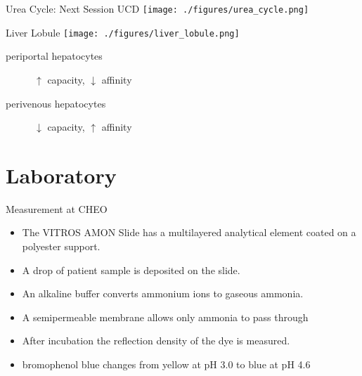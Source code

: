 \documentclass[presentation, smaller]{beamer}
\begin{document}
\begin{frame}[label={sec:orgheadline4}]{Urea Cycle: Next Session UCD}
\centering
   \texttt{[image: ./figures/urea\_cycle.png]}
\end{frame}

\begin{frame}[label={sec:orgheadline5}]{Liver Lobule}
\centering
\texttt{[image: ./figures/liver\_lobule.png]}

\begin{description}
\item[{periportal hepatocytes}] \(\uparrow\) capacity, \(\downarrow\) affinity
\item[{perivenous hepatocytes}] \(\downarrow\) capacity, \(\uparrow\) affinity
\end{description}
\end{frame}


\section{Laboratory}
\label{sec:orgheadline11}
\begin{frame}[label={sec:orgheadline7}]{Measurement at CHEO}
\begin{itemize}
\item The VITROS AMON Slide has a multilayered analytical element coated
on a polyester support.
\item A drop of patient sample is deposited on the slide.
\item An  alkaline buffer converts ammonium ions to gaseous ammonia.
\item A semipermeable membrane allows only ammonia to pass through
\item After incubation the reflection density of the dye is measured.
\end{itemize}

\begin{block}{}
\centering
{}
\end{block}

\begin{itemize}
\item bromophenol blue changes from yellow at pH 3.0 to blue at pH 4.6
\end{itemize}
\end{frame}
\end{document}
